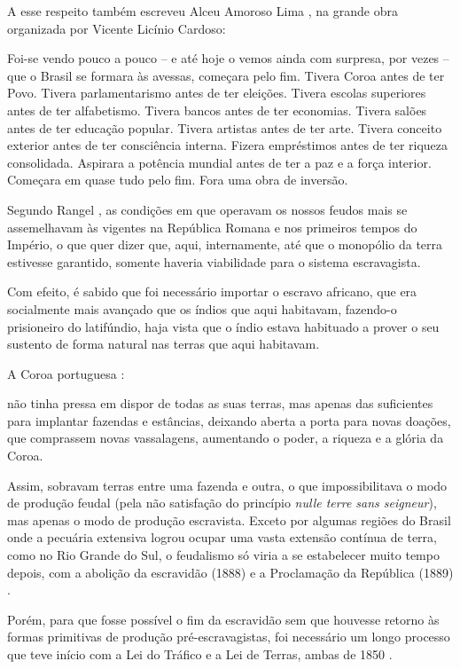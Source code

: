 \documentclass[
	12pt,				%
	oneside,			%
	a4paper,			%
	chapter=TITLE,		%
	section=TITLE,		%
	english,			%
	brazil				%
	]{abntex2}
\begin{document}
\begin{refsection}
A esse respeito também escreveu Alceu Amoroso Lima \autocite*[51]{amoroso}, na grande
obra organizada por Vicente Licínio Cardoso:
\begin{citacao}
Foi-se vendo pouco a pouco – e até hoje o vemos ainda com surpresa, por vezes –
que o Brasil se formara às avessas, começara pelo fim. Tivera Coroa antes de ter
Povo. Tivera parlamentarismo antes de ter eleições. Tivera escolas superiores
antes de ter alfabetismo. Tivera bancos antes de ter economias. Tivera salões
antes de ter educação popular. Tivera artistas antes de ter arte. Tivera
conceito exterior antes de ter consciência interna. Fizera empréstimos antes de
ter riqueza consolidada. Aspirara a potência mundial antes de ter a paz e a
força interior. Começara em quase tudo pelo fim. Fora uma obra de inversão.
\end{citacao}
Segundo Rangel \autocite*[729]{rangel1989}, as condições em que operavam os nossos
feudos mais se assemelhavam às vigentes na República Romana e nos primeiros
tempos do Império, o que quer dizer que, aqui, internamente, até que o monopólio
da terra estivesse garantido, somente haveria viabilidade para o sistema
escravagista.

Com efeito, é sabido que foi necessário importar o escravo africano, que era
socialmente mais avançado que os índios que aqui habitavam, fazendo-o
prisioneiro do latifúndio, haja vista que o índio estava habituado a prover o
seu sustento de forma natural nas terras que aqui habitavam.

A Coroa portuguesa \autocite[731]{rangel1989}:
\begin{citacao}
não tinha pressa em dispor de todas as suas terras, mas apenas das suficientes
para implantar fazendas e estâncias, deixando aberta a porta para novas doações,
que comprassem novas vassalagens, aumentando o poder, a riqueza e a glória da
Coroa.
\end{citacao}
Assim, sobravam terras entre uma fazenda e outra, o que impossibilitava o modo
de produção feudal (pela não satisfação do princípio \emph{nulle terre sans
seigneur}), mas apenas o modo de produção escravista. Exceto por algumas regiões
do Brasil onde a pecuária extensiva logrou ocupar uma vasta extensão contínua de
terra, como no Rio Grande do Sul, o feudalismo só viria a se estabelecer muito
tempo depois, com a abolição da escravidão (1888) e a Proclamação da República
(1889) \autocite[732-733]{rangel1989}.

Porém, para que fosse possível o fim da escravidão sem que houvesse retorno às
formas primitivas de produção pré-escravagistas, foi necessário um longo
processo que teve início com a Lei do Tráfico e a Lei de Terras, ambas de 1850
\autocite[732]{rangel1989}.


\end{refsection}
\end{document}
